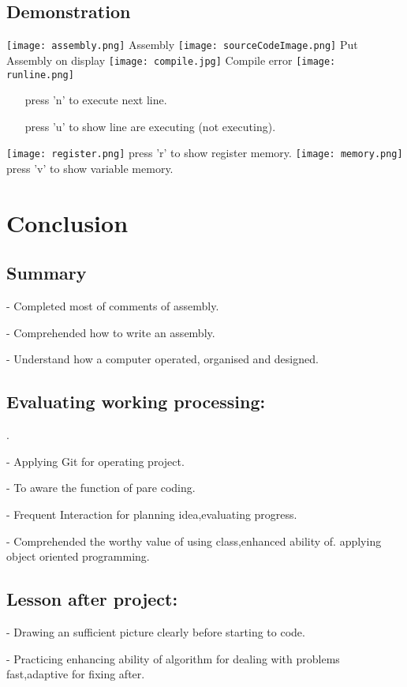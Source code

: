 \documentclass[10pt]{article}
\begin{document}
\begin{large}
    \subsection{Demonstration}
        \begin{center}
            \texttt{[image: assembly.png]}
            Assembly
            \texttt{[image: sourceCodeImage.png]}
            Put Assembly on display
            \texttt{[image: compile.jpg]}
            Compile error
            \texttt{[image: runline.png]}
            \begin{itemize}
                \item[]
                    press 'n' to execute next line.
                \item[]
                    press 'u' to show line are executing (not executing).
            \end{itemize}
            \texttt{[image: register.png]}
            press 'r' to show register memory.
            \texttt{[image: memory.png]}
            press 'v' to show variable memory.
        \end{center}

\section{Conclusion}\label{conclusion}
    \begin{large}
    \subsection{Summary}
        \item[-] Completed most of comments of assembly.
        \item[-]Comprehended how to write an assembly.
        \item[-]Understand how a computer operated, organised and designed.
    \subsection{Evaluating working processing:}.
        \item[-]Applying Git for operating project.
        \item[-]To aware the function of pare coding.
        \item[-]Frequent Interaction for planning idea,evaluating progress.
        \item[-]Comprehended the worthy value of using class,enhanced ability of. applying object oriented programming.
    \subsection{Lesson after project:}
        \item[-]Drawing an sufficient picture clearly before starting to code.
        \item[-]Practicing enhancing ability of algorithm for dealing with problems fast,adaptive for fixing after.
    \end{large}
    
\end{large}
\end{document}
